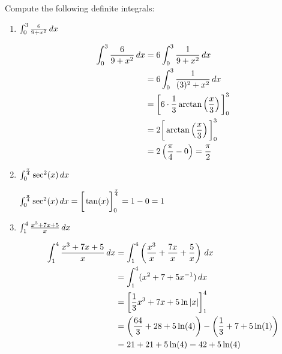 \documentclass[nooutcomes]{ximera}
\begin{document}
\begin{problem}
Compute the following definite integrals:
	\begin{enumerate}
	
	\item  $\int_0^3 \frac{6}{9 + x^2} \,d x $
		\begin{freeResponse}
			\begin{align*}
			\int_0^3 \frac{6}{9 + x^2} \,d x &= 6 \int_0^3 \frac{1}{9 + x^2} \,d x  \\
			&= 6 \int_0^3 \frac{1}{(3)^2 + x^2} \,d x  \\
			&= \bigg[ 6 \cdot \frac{1}{3} \arctan \left( \frac{x}{3} \right) \bigg]_0^3  \\
			&= 2 \bigg[  \arctan \left( \frac{x}{3} \right) \bigg]_0^3  \\
			&= 2 \left( \frac{\pi}{4} - 0 \right) = \frac{\pi}{2}
			\end{align*}
		\end{freeResponse}
		
		
		
	\item  $\int_0^{\frac{\pi}{4}} \sec^2 (x) \,d x$
		\begin{freeResponse}
		$\int_0^{\frac{\pi}{4}} \sec^2 (x) \,d x = \bigg[ \tan(x) \bigg]_0^{\frac{\pi}{4}} = 1 - 0 = 1$
		\end{freeResponse}
		
		
		
	\item  $\int_1^4 \frac{x^3 + 7x + 5}{x} \,d x$
		\begin{freeResponse}
			\begin{align*}
			\int_1^4 \frac{x^3 + 7x + 5}{x} \,d x &= \int_1^4 \left( \frac{x^3}{x} + \frac{7x}{x} + \frac{5}{x} \right) \,d x  \\
			&= \int_1^4 ( x^2 + 7 + 5x^{-1} ) \,d x  \\
			&= \bigg[ \frac{1}{3} x^3 + 7x + 5\ln |x|  \bigg]_1^4  \\
			&= \left( \frac{64}{3} + 28 + 5\ln(4) \right) - \left( \frac{1}{3} + 7 + 5 \ln(1) \right)  \\
			&= 21 + 21 + 5\ln(4) = 42 + 5\ln(4)
			\end{align*}
		\end{freeResponse}
		
		
		

\end{enumerate}
\end{problem}
\end{document}
